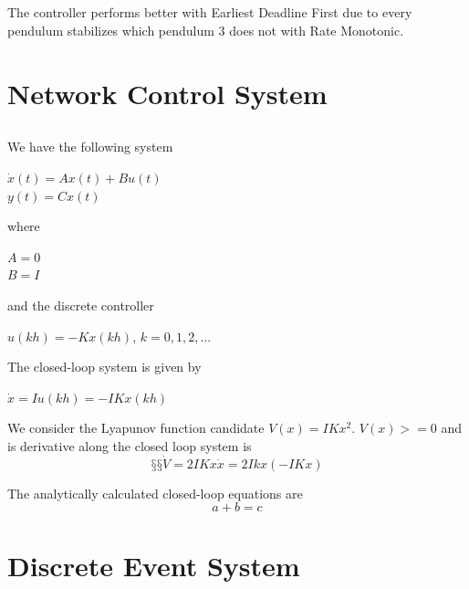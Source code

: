 \documentclass[12pt,a4paper]{article}
\begin{document}
\subsection{}
The controller performs better with Earliest Deadline First due to every pendulum stabilizes which pendulum 3 does not with Rate Monotonic. 

\section{Network Control System}
\subsection{} %
We have the following system
\begin{center}

$\dot{x}(t) = Ax(t)+Bu(t)$ \\
$y(t) = Cx(t)$
\end{center}
where
\begin{center}
$A=0$ \\
$B=I$
\end{center}
and the discrete controller
\begin{center}
$u(kh) = -Kx(kh)$,    $k = 0,1,2,...$
\end{center}

The closed-loop system is given by
\begin{center}
$\dot{x} = Iu(kh)= -IKx(kh)$
\end{center}
We consider the Lyapunov function candidate $V(x)=IKx^2$. $V(x) >=0$ and is derivative along the closed loop system is
\begin{equation}
§§\dot{V}=2IKx\dot{x}=2Ikx(-IKx)
\end{equation}

The analytically calculated closed-loop equations are
\begin{equation}
a+b=c
\end{equation}


\section{Discrete Event System}
\end{document}
